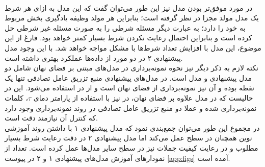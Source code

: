 \\
در مورد موفق‌تر بودن مدل \sentigan{} نیز این طور می‌توان گفت که این مدل به ازای هر شرط یک مدل مولد مجزا در نظر گرفته است؛ بنابراین هر مولد وظیفه یادگیری بخش مربوط به خود را دارد؛ به عبارت دیگر مسئله شرطی را به صورت مسئله غیر شرطی حل کرده است و بنابراین احتمال رعایت نکردن شرط بسیار کمتر خواهد بود. فارغ از این موضوع، این مدل با افزایش تعداد شرط‌ها با مشکل مواجه خواهد شد. با این وجود مدل پیشنهادی ۲ در دو مورد از داده‌ها عملکرد بهتری داشته است. 
\\
نکته لازم به ذکر دیگر نیز نحوه نمونه‌برداری در مدل‌های مبتنی بر فضای نهان شامل دو مدل پیشنهادی و مدل \towardctg{} است. در مدل‌های پیشنهادی منبع تزریق عامل تصادفی تنها یک نقطه بوده و آن نیز نمونه‌برداری از فضای نهان است و از \greedydecoding{} در \decoder{} استفاده می‌شود. این در حالیست که در مدل \towardctg{} علاوه بر فضای نهان، در \decoder{} نیز با استفاده از پارامتر دمای $\tau$، کلمات نمونه‌برداری شده و عملا دو منبع تزریق عامل تصادفی در روند نمونه‌برداری وجود دارد که کنترل آن نیازمند دقت است.
\\
در مجموع این طور می‌توان جمع‌بندی نمود که مدل پیشنهادی ۱ با داشتن روند آموزشی نوین همچنان در سطح \towardctg{} عمل می‌کند اما مدل پیشنهادی ۲ در دقت رعایت شرط بسیار مطلوب و در رعایت کیفیت جملات نیز در سطح سایر مدل‌ها عمل کرده است. تعداد از نمودار‌های آموزش مدل‌های پیشنهادی ۱ و ۲ در پیوست \ref{app:figs} آمده است.

\iffalse
